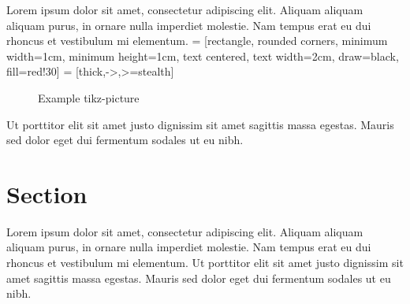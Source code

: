 \documentclass[11pt,a4paper,oneside,article]{memoir}
\begin{document}
Lorem ipsum dolor sit amet, consectetur adipiscing elit. Aliquam aliquam aliquam purus, in ornare nulla imperdiet molestie. Nam tempus erat eu dui rhoncus et vestibulum mi elementum. 
 = [rectangle, rounded corners, minimum width=1cm, minimum height=1cm, text centered, text width=2cm, draw=black, fill=red!30]
 = [thick,->,>=stealth]
\begin{figure}[htbp]
\centering
{}
\caption{Example tikz-picture}
\label{fig:tikz}
\end{figure}
Ut porttitor elit sit amet justo dignissim sit amet sagittis massa egestas. Mauris sed dolor eget dui fermentum sodales ut eu nibh. 

\section{Section}

Lorem ipsum dolor sit amet, consectetur adipiscing elit. Aliquam aliquam aliquam purus, in ornare nulla imperdiet molestie. Nam tempus erat eu dui rhoncus et vestibulum mi elementum. Ut porttitor elit sit amet justo dignissim sit amet sagittis massa egestas. Mauris sed dolor eget dui fermentum sodales ut eu nibh. 



\begin{flushleft}
\begin{singlespacing}

\end{singlespacing}
\end{flushleft}

\label{LastPage}~
\end{document}
